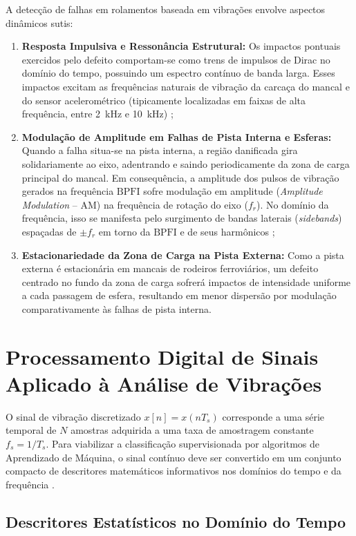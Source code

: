 A detecção de falhas em rolamentos baseada em vibrações envolve aspectos dinâmicos sutis:
\begin{enumerate}
    \item \textbf{Resposta Impulsiva e Ressonância Estrutural:} Os impactos pontuais exercidos pelo defeito comportam-se como trens de impulsos de Dirac no domínio do tempo, possuindo um espectro contínuo de banda larga. Esses impactos excitam as frequências naturais de vibração da carcaça do mancal e do sensor acelerométrico (tipicamente localizadas em faixas de alta frequência, entre \SI{2}{\kilo\hertz} e \SI{10}{\kilo\hertz}) \cite{randall2011rolling};
    \item \textbf{Modulação de Amplitude em Falhas de Pista Interna e Esferas:} Quando a falha situa-se na pista interna, a região danificada gira solidariamente ao eixo, adentrando e saindo periodicamente da zona de carga principal do mancal. Em consequência, a amplitude dos pulsos de vibração gerados na frequência $\text{BPFI}$ sofre modulação em amplitude (\textit{Amplitude Modulation} -- AM) na frequência de rotação do eixo ($f_r$). No domínio da frequência, isso se manifesta pelo surgimento de bandas laterais (\textit{sidebands}) espaçadas de $\pm f_r$ em torno da $\text{BPFI}$ e de seus harmônicos \cite{smith2015rolling};
    \item \textbf{Estacionariedade da Zona de Carga na Pista Externa:} Como a pista externa é estacionária em mancais de rodeiros ferroviários, um defeito centrado no fundo da zona de carga sofrerá impactos de intensidade uniforme a cada passagem de esfera, resultando em menor dispersão por modulação comparativamente às falhas de pista interna.
\end{enumerate}

\section{Processamento Digital de Sinais Aplicado à Análise de Vibrações}
\label{sec:processamento_sinais}

O sinal de vibração discretizado $x[n] = x(n T_s)$ corresponde a uma série temporal de $N$ amostras adquirida a uma taxa de amostragem constante $f_s = 1/T_s$. Para viabilizar a classificação supervisionada por algoritmos de Aprendizado de Máquina, o sinal contínuo deve ser convertido em um conjunto compacto de descritores matemáticos informativos nos domínios do tempo e da frequência \cite{oppenheim2010discrete}.

\subsection{Descritores Estatísticos no Domínio do Tempo}
\label{subsec:features_tempo}

